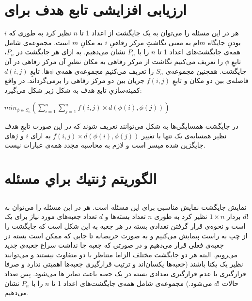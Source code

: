 \documentclass{article}
\begin{document}
\section{ارزیابی افزایشی تابع هدف برای }
هر  در این مسئله را می‌توان به یک جایگشت از اعداد 1 تا $n$ نظیر کرد به طوری که $i$ بودنِ جایگاه $m$ام به معنی نگاشتِ مرکز رفاهیِ $i$ به مکانِ $m$ است. مجموعه‌ی شامل همه‌ی جایگشت‌های اعداد 1 تا $n$ را با $P_{n}$ نشان می‌دهیم.
به ازای هر جایگشت در $P_{n}$، تابعِ $\phi$ را تعریف می‌کنیم نگاشت از مرکز رفاهی به مکان نظیرِ آن مرکز رفاهی در آن جایگشت. همچنین مجموعه‌ی 
$
S_{n}
$
را تعریف می‌کنیم مجموعه‌ی همه‌ی $\phi$ها. 
 تابعِ 
$
d(i, j)
$
فاصله‌ی بین دو مکان و تابعِ 
$
f(i, j)
$
جریان بین دو مرکز رفاهی را برمی‌گرداند. در واقع کمینه‌سازیِ تابع هدف به شکل زیر شکل می‌گیرد:
\begin{latin}
$
min_{\phi \in S_{n}}(\sum_{i=1}^{n}\sum_{j=1}^{n} f(i, j)\times d(\phi(i), \phi(j)))
$
\end{latin}
در جایگشت همسایگی‌ها به شکل  می‌توانند تعریف شوند که در این صورت تابعِ هدف نظیر همسایه‌ی یک  تنها با تغییر
$f(i, j)\times d(\phi(i), \phi(j))$
به ازای $i$ و $j$های جایگزین شده میسر است و لازم به محاسبه مجدد همه‌ی عبارات نیست.


\section{الگوريتم ژنتيك براي مسئله }
\subsection{}
نمایش جایگشت نمایش مناسبی برای این مسئله است. هر  در این مسئله را می‌توان به $d!$ بردار
$1 \times n$
نظیر کرد به طوری $n$ تعداد بسته‌ها و $d$ تعداد جعبه‌های مورد نیاز برای یک   است و نحوه‌ی قرار گرفتن تعدادی بسته در هر جعبه به این شکل است که جایگشت را از چپ به راست پیمایش می‌کنیم و به صورت حریصانه تا جایی که ممکن است بسته در جعبه‌ی فعلی قرار می‌دهیم و در صورتی که جعبه جا نداشت سراغ جعبه‌ی جدید می‌رویم. البته هر دو جایگشت مختلف الزاما متناظر با دو  متفاوت نیستند و می‌توانند نظیر یک  یکتا باشند (جعبه‌ها یکسان‌اند و ترتیب قرارگیری جعبه‌ها اهمیتی ندارد و صرفا قرارگیری یا عدم قرارگیری تعدادی بسته در یک جعبه باعث تمایز ها می‌شود. پس تعداد حالات $d!$ می‌شود.)
\newline
مجموعه‌ی شامل همه‌ی جایگشت‌های اعداد 1 تا $n$ را با $P_{n}$ نشان می‌دهیم.
\end{document}

